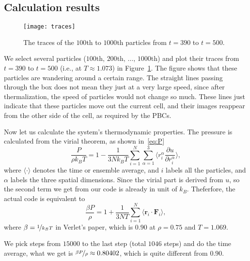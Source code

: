 \subsection{Calculation results}

\begin{figure}[H]
    \centering
    \texttt{[image: traces]}
    \caption{The traces of the \(100\)th to \(1000\)th particles from \(t = 390\) to \(t = 500\).}
    \label{fig:traces}
\end{figure}

We select several particles (\(100\)th, \(200\)th, \(\ldots\), \(1000\)th) and plot their traces
from \(t = 390\) to \(t = 500\) (i.e., at \(T \approx 1.073\)) in Figure~\ref{fig:traces}.
The figure shows that these particles are wandering around a certain
range. The straight lines passing through the box does not mean they just at a very
large speed, since after thermalization, the speed of particles would not change so
much. These lines just indicate that these particles move out the current cell,
and their images reappear from the other side of the cell, as required by the PBCs.

Now let us calculate the  system's thermodynamic properties.
The pressure is calculated from the virial theorem, as shown in~\eqref{eq:P}
%
\begin{equation}\label{eq:P}
    \frac{ P }{ \rho k_B T } = 1 - \frac{ 1 }{ 3N k_B T } \sum_{i=1}^{N}
    \sum_{\alpha=1}^{3}
    \biggl \langle r_i^\alpha \frac{ \partial u }{ \partial r_i^\alpha } \biggr \rangle,
\end{equation}
%
where \(\langle \cdot \rangle\) denotes the time or ensemble average,
and \(i\) labels all the particles, and \(\alpha\) labels the three spatial dimensions.
Since the virial part is derived from \(u\), so the second term we get from our code
is already in unit of \(k_B\). Theferfore, the actual code is
equivalent to
%
\begin{equation}\label{eq:P}
    \frac{ \beta P }{ \rho } = 1 + \frac{ 1 }{ 3N T } \sum_{i=1}^{N}
    \langle \bm{r}_i \cdot \bm{F}_i \rangle,
\end{equation}
%
where \(\beta = \nicefrac{ 1 }{ k_B T }\) in Verlet's paper\cite{Verlet},
which is \(0.90\) at \(\rho = 0.75\) and \(T = 1.069\).

We pick steps from \(15000\) to the last step (total \(1046\) steps) and do the time average,
what we get is \(\nicefrac{ \beta P }{ \rho } \approx 0.80402\), which is quite
different from \(0.90\).

